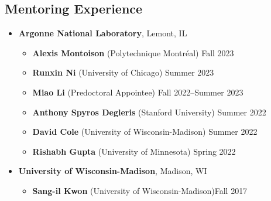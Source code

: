 \documentclass[letterpaper, 11pt]{article}
\begin{document}
\subsection*{Mentoring Experience}
\begin{itemize}[leftmargin=*]
\item[] {\bf Argonne National Laboratory}, Lemont, IL
  \begin{itemize}[leftmargin=*]
  \item[] {\bf Alexis Montoison} (Polytechnique Montr\'{e}al) \hfill Fall 2023
  \item[] {\bf Runxin Ni} (University of Chicago) \hfill Summer 2023
  \item[] {\bf Miao Li} (Predoctoral Appointee) \hfill Fall 2022--Summer 2023
  \item[] {\bf Anthony Spyros Degleris} (Stanford University) \hfill Summer 2022
  \item[] {\bf David Cole} (University of Wisconsin-Madison) \hfill Summer 2022
  \item[] {\bf Rishabh Gupta} (University of Minnesota) \hfill Spring 2022
  \end{itemize}
\item[] {\bf University of Wisconsin-Madison}, Madison, WI
  \begin{itemize}[leftmargin=*]
  \item[] {\bf Sang-il Kwon} (University of Wisconsin-Madison)\hfill Fall 2017
  \end{itemize}
\end{itemize}
\end{document}
